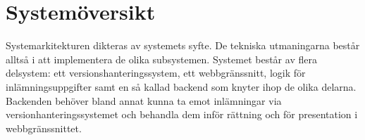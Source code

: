 \section{Systemöversikt}
Systemarkitekturen dikteras av systemets syfte. De tekniska utmaningarna består alltså i att implementera de olika subsystemen. 
Systemet består av flera delsystem: ett versionshanteringssystem, ett webbgränssnitt, logik för inlämningsuppgifter samt en så kallad backend som knyter ihop de olika delarna. Backenden behöver bland annat kunna ta emot inlämningar via versionhanteringssystemet och behandla dem inför rättning och för presentation i webbgränssnittet.